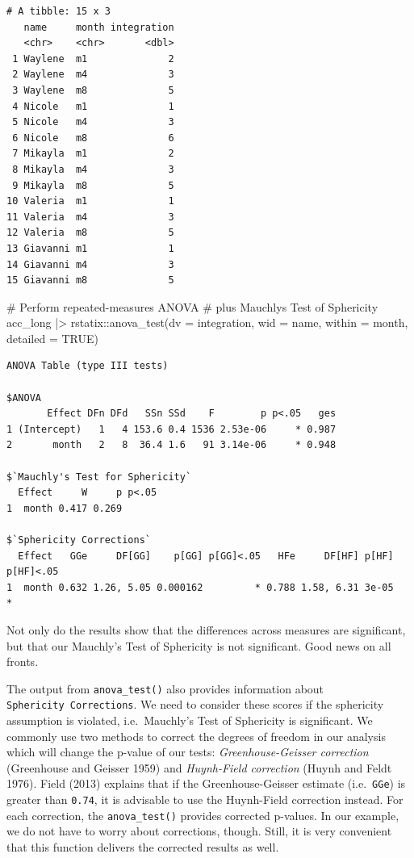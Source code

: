 \documentclass[
  letterpaper,
]{krantz}
\makeatletter
\newenvironment{Shaded}{\begin{snugshade}}{\end{snugshade}}
\newcommand{\AttributeTok}[1]{\textcolor[rgb]{0.40,0.45,0.13}{#1}}
\newcommand{\CommentTok}[1]{\textcolor[rgb]{0.37,0.37,0.37}{#1}}
\newcommand{\ConstantTok}[1]{\textcolor[rgb]{0.56,0.35,0.01}{#1}}
\newcommand{\FunctionTok}[1]{\textcolor[rgb]{0.28,0.35,0.67}{#1}}
\newcommand{\NormalTok}[1]{\textcolor[rgb]{0.00,0.23,0.31}{#1}}
\newcommand{\SpecialCharTok}[1]{\textcolor[rgb]{0.37,0.37,0.37}{#1}}
\newenvironment{kframe}{%
\medskip{}
\setlength{\fboxsep}{.8em}
 \def\at@end@of@kframe{}%
 \ifinner\ifhmode%
  \def\at@end@of@kframe{\end{minipage}}%
  \begin{minipage}{\columnwidth}%
 \fi\fi%
 \def\FrameCommand##1{\hskip\@totalleftmargin \hskip-\fboxsep
 \colorbox{shadecolor}{##1}\hskip-\fboxsep
     \hskip-\linewidth \hskip-\@totalleftmargin \hskip\columnwidth}%
 \MakeFramed {\advance\hsize-\width
   \@totalleftmargin\z@ \linewidth\hsize
   \@setminipage}}%
 {\par\unskip\endMakeFramed%
 \at@end@of@kframe}
\renewenvironment{Shaded}{\begin{kframe}}{\end{kframe}}
\makeatother
\begin{document}
\begin{verbatim}
# A tibble: 15 x 3
   name     month integration
   <chr>    <chr>       <dbl>
 1 Waylene  m1              2
 2 Waylene  m4              3
 3 Waylene  m8              5
 4 Nicole   m1              1
 5 Nicole   m4              3
 6 Nicole   m8              6
 7 Mikayla  m1              2
 8 Mikayla  m4              3
 9 Mikayla  m8              5
10 Valeria  m1              1
11 Valeria  m4              3
12 Valeria  m8              5
13 Giavanni m1              1
14 Giavanni m4              3
15 Giavanni m8              5
\end{verbatim}

\begin{Shaded}
\begin{Highlighting}[]
\CommentTok{\# Perform repeated{-}measures ANOVA}
\CommentTok{\# plus Mauchly\textquotesingle{}s Test of Sphericity}
\NormalTok{acc\_long }\SpecialCharTok{|\textgreater{}}
\NormalTok{  rstatix}\SpecialCharTok{::}\FunctionTok{anova\_test}\NormalTok{(}\AttributeTok{dv =}\NormalTok{ integration,}
                      \AttributeTok{wid =}\NormalTok{ name,}
                      \AttributeTok{within =}\NormalTok{ month,}
                      \AttributeTok{detailed =} \ConstantTok{TRUE}\NormalTok{)}
\end{Highlighting}
\end{Shaded}

\begin{verbatim}
ANOVA Table (type III tests)

$ANOVA
       Effect DFn DFd   SSn SSd    F        p p<.05   ges
1 (Intercept)   1   4 153.6 0.4 1536 2.53e-06     * 0.987
2       month   2   8  36.4 1.6   91 3.14e-06     * 0.948

$`Mauchly's Test for Sphericity`
  Effect     W     p p<.05
1  month 0.417 0.269      

$`Sphericity Corrections`
  Effect   GGe     DF[GG]    p[GG] p[GG]<.05   HFe     DF[HF] p[HF] p[HF]<.05
1  month 0.632 1.26, 5.05 0.000162         * 0.788 1.58, 6.31 3e-05         *
\end{verbatim}

Not only do the results show that the differences across measures are
significant, but that our Mauchly's Test of Sphericity is not
significant. Good news on all fronts.

The output from \texttt{anova\_test()} also provides information about
\texttt{Sphericity\ Corrections}. We need to consider these scores if
the sphericity assumption is violated, i.e.~Mauchly's Test of Sphericity
is significant. We commonly use two methods to correct the degrees of
freedom in our analysis which will change the p-value of our tests:
\emph{Greenhouse-Geisser correction} (Greenhouse and Geisser 1959) and
\emph{Huynh-Field correction} (Huynh and Feldt 1976). Field (2013)
explains that if the Greenhouse-Geisser estimate (i.e.~\texttt{GGe}) is
greater than \texttt{0.74}, it is advisable to use the Huynh-Field
correction instead. For each correction, the \texttt{anova\_test()}
provides corrected p-values. In our example, we do not have to worry
about corrections, though. Still, it is very convenient that this
function delivers the corrected results as well.
\end{document}

